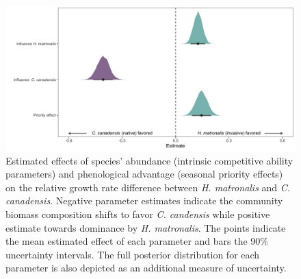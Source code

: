 \documentclass{article}[11pt]
\begin{document}
\begin{figure}[h!]
    \centering
\includegraphics[width=\textwidth]{..//figure/mu_plots.jpeg}
    \caption{Estimated effects of species' abundance (intrinsic competitive ability parameters) and phenological advantage (seasonal priority effects) on the relative growth rate difference between \textit{H. matronalis} and \textit{C. canadensis}. Negative parameter estimates indicate the community biomass composition shifts to favor \textit{C. candensis} while positive estimate towards dominance by \textit{ H. matronalis}. The points indicate the mean estimated effect of each parameter and bars the 90\% uncertainty intervals. The full posterior distribution for each parameter is also depicted as an additional measure of uncertainty.} 
    \label{fig:RGRD}
\end{figure}
\end{document}
